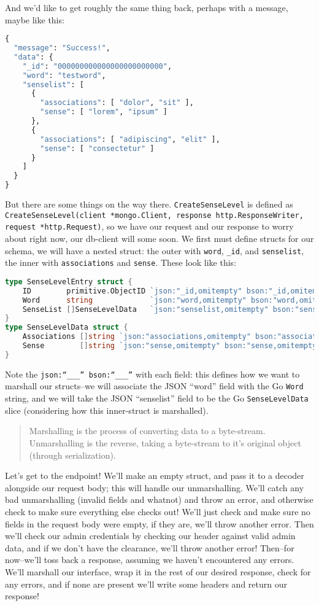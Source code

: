 \documentclass[11pt, twoside, reqno]{book}
\begin{document}
And we'd like to get roughly the same thing back, perhaps with a message, maybe like this:
\begin{lstlisting}[language=Python]
{
  "message": "Success!",
  "data": {
    "_id": "000000000000000000000000",
    "word": "testword",
    "senselist": [
      {
        "associations": [ "dolor", "sit" ],
        "sense": [ "lorem", "ipsum" ]
      },
      {
        "associations": [ "adipiscing", "elit" ],
        "sense": [ "consectetur" ]
      }
    ]
  }
}
\end{lstlisting}

But there are some things on the way there. \texttt{CreateSenseLevel} is defined as \texttt{CreateSenseLevel(client *mongo.Client, response http.ResponseWriter, request *http.Request)}, so we have our request and our response to worry about right now, our db-client will some soon. We first must define structs for our schema, we will have a nested struct: the outer with \texttt{word}, \texttt{\_id}, and \texttt{senselist}, the inner with \texttt{associations} and \texttt{sense}. These look like this:
\begin{lstlisting}[language=Go]
type SenseLevelEntry struct {
	ID        primitive.ObjectID `json:"_id,omitempty" bson:"_id,omitempty"`
	Word      string             `json:"word,omitempty" bson:"word,omitempty"`
	SenseList []SenseLevelData   `json:"senselist,omitempty" bson:"senselist,omitempty"`
}
type SenseLevelData struct {
	Associations []string `json:"associations,omitempty" bson:"associations,omitempty"`
	Sense        []string `json:"sense,omitempty" bson:"sense,omitempty"`
}
\end{lstlisting}

Note the \texttt{json:``\_\_\_'' bson:``\_\_\_''} with each field: this defines how we want to marshall our structs--we will associate the JSON ``word'' field with the Go \texttt{Word} string, and we will take the JSON ``senselist'' field to be the Go \texttt{SenseLevelData} slice (considering how this inner-struct is marshalled).

\begin{quote}
Marshalling is the process of converting data to a byte-stream. Unmarshalling is the reverse, taking a byte-stream to it's original object (through serialization).
\end{quote}

Let's get to the endpoint! We'll make an empty struct, and pass it to a decoder alongside our request body; this will handle our unmarshalling. We'll catch any bad unmarshalling (invalid fields and whatnot) and throw an error, and otherwise check to make sure everything else checks out! We'll just check and make sure no fields in the request body were empty, if they are, we'll throw another error. Then we'll check our admin credentials by checking our header against valid admin data, and if we don't have the clearance, we'll throw another error! Then--for now--we'll toss back a response, assuming we haven't encountered any errors. We'll marshall our interface, wrap it in the rest of our desired response, check for any errors, and if none are present we'll write some headers and return our response!
\end{document}
